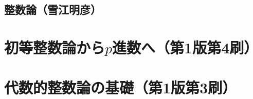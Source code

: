 \documentclass[a4paper]{ltjsreport}
\begin{document}
\chapter*{整数論（雪江明彦）}
\tableofcontents
\part{初等整数論から$p$進数へ（第1版第4刷）}

\part{代数的整数論の基礎（第1版第3刷）}



\end{document}
